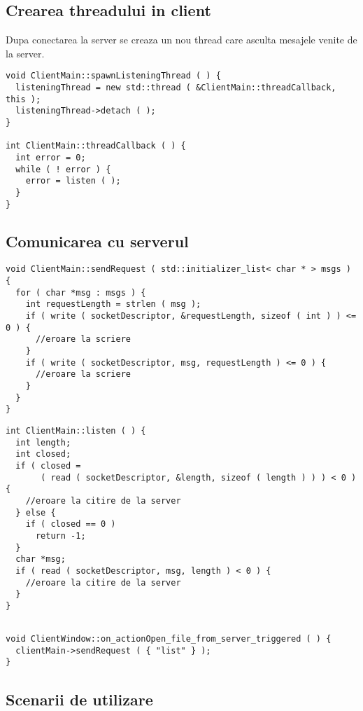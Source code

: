 \documentclass[runningheads]{llncs}
\begin{document}
\subsection{Crearea threadului in client}

Dupa conectarea la server se creaza un nou thread care asculta mesajele venite de la server.

\begin{lstlisting}
void ClientMain::spawnListeningThread ( ) {
  listeningThread = new std::thread ( &ClientMain::threadCallback, this );
  listeningThread->detach ( );
}

int ClientMain::threadCallback ( ) {
  int error = 0;
  while ( ! error ) {
    error = listen ( );
  }
}
\end{lstlisting}


\subsection{Comunicarea cu serverul}

\begin{lstlisting}
void ClientMain::sendRequest ( std::initializer_list< char * > msgs ) {
  for ( char *msg : msgs ) {
    int requestLength = strlen ( msg );
    if ( write ( socketDescriptor, &requestLength, sizeof ( int ) ) <= 0 ) {
      //eroare la scriere
    }
    if ( write ( socketDescriptor, msg, requestLength ) <= 0 ) {
      //eroare la scriere
    }
  }
}
\end{lstlisting}


\begin{lstlisting}
int ClientMain::listen ( ) {
  int length;
  int closed;
  if ( closed =
       ( read ( socketDescriptor, &length, sizeof ( length ) ) ) < 0 ) {
    //eroare la citire de la server
  } else {
    if ( closed == 0 ) 
      return -1;
  }
  char *msg;
  if ( read ( socketDescriptor, msg, length ) < 0 ) {
    //eroare la citire de la server
  }
}
\end{lstlisting}

\begin{lstlisting}

void ClientWindow::on_actionOpen_file_from_server_triggered ( ) {
  clientMain->sendRequest ( { "list" } );
}

\end{lstlisting}

\subsection{Scenarii de utilizare}
\end{document}
